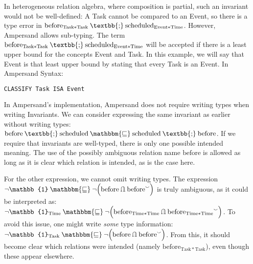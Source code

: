 \documentclass[12pt]{article}
\newcommand{\typesemi}{\mathbin{\text{\textbb{;}}}}
\newcommand{\typesubset}{\mathbin{\mathbbm{\sqsubseteq}}}
\newcommand{\typeunion}{\mathbin{\mathbb{U}}}
\newcommand{\typeinter}{\mathbin{\text{\rotatebox[origin=c]{180}{$\typeunion$}}}}
\newcommand{\typecomp}[1]{\neg{#1}}
\newcommand{\typeconv}[1]{{#1}^\smallsmile}
\newcommand{\typeident}{\mathbb{1}}
\begin{document}
In heterogeneous relation algebra, where composition is partial, such an invariant would not be well-defined: A Task cannot be compared to an Event, so there is a type error in $\mathrm{before}_{\mathrm{Task * Task}}\typesemi\mathrm{scheduled}_{\mathrm{Event * Time}}$.
However, Ampersand allows sub-typing.
The term $\mathrm{before}_{\mathrm{Task * Task}}\typesemi\mathrm{scheduled}_{\mathrm{Event * Time}}$ will be accepted if there is a least upper bound for the concepts Event and Task.
In this example, we will say that Event is that least upper bound by stating that every Task is an Event.
In Ampersand Syntax:

\begin{verbatim}
CLASSIFY Task ISA Event
\end{verbatim}

In Ampersand's implementation, Ampersand does not require writing types when writing Invariants.
We can consider expressing the same invariant as earlier without writing types: $\mathrm{before}\typesemi \mathrm{scheduled} \typesubset \mathrm{scheduled}\typesemi \mathrm{before}$.
If we require that invariants are well-typed, there is only one possible intended meaning.
The use of the possibly ambiguous relation name $\mathrm{before}$ is allowed as long as it is clear which relation is intended, as is the case here.

For the other expression, we cannot omit writing types. The expression $\typecomp\typeident \typesubset \typecomp{\left(\mathrm{before} \typeinter \typeconv{{\mathrm{before}}}\right)}$ is truly ambiguous, as it could be interpreted as:
$\typecomp{\typeident_{\mathrm{Time}}} \typesubset \typecomp{\left(\mathrm{before}_{\mathrm{Time * Time}} \typeinter \typeconv{\mathrm{before}_{\mathrm{Time * Time}}}\right)}$.
To avoid this issue, one might write \emph{some} type information: $\typecomp\typeident_\mathrm{Task} \typesubset \typecomp{\left(\mathrm{before} \typeinter \typeconv{{\mathrm{before}}}\right)}$.
From this, it should become clear which relations were intended (namely $\mathrm{before}_\mathrm{Task * Task}$), even though these appear elsewhere.
\end{document}
